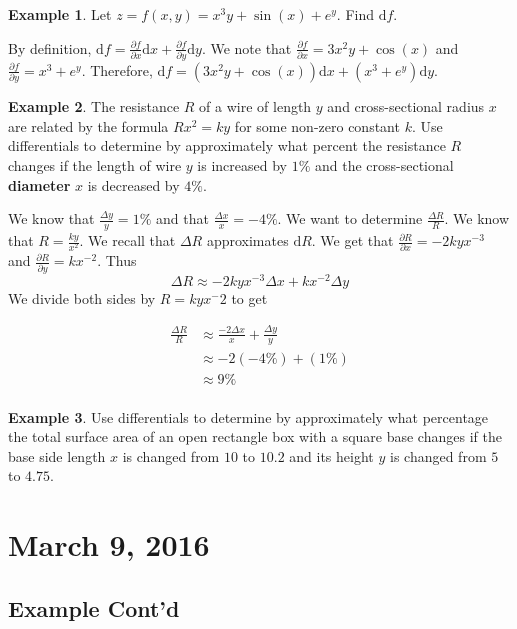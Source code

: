 \documentclass[11pt]{article}
\theoremstyle{plain} %
\theoremstyle{definition}
\theoremstyle{example}
\newtheorem*{example}{Example}
\theoremstyle{remark}
\begin{document}
\begin{example}
Let $z = f(x,y) = x^3y+\sin(x)+e^y$. Find $\mathrm d f$. 

\end{example}By definition, $\mathrm d f = \frac{\partial f}{\partial x} \mathrm d x+ \frac{\partial f}{\partial y} \mathrm d y$. We note that $\frac{\partial f}{\partial x} = 3x^2y + \cos(x)$ and $\frac{\partial f}{\partial y} = x^3 + e^y$. Therefore, $\mathrm d f = \left(3x^2y + \cos(x)\right)\mathrm d x + \left(x^3 + e^y\right)\mathrm d y$.

\begin{example}
The resistance $R$ of a wire of length $y$ and cross-sectional radius $x$ are related by the formula $Rx^2 = ky$ for some non-zero constant $k$. Use differentials to determine by approximately what percent the resistance $R$ changes if the length of wire $y$ is increased by $1\%$ and the cross-sectional \textbf{diameter} $x$ is decreased by $4\%$. 

\end{example}

We know that $\frac{\Delta y}{y} = 1\%$ and that $\frac{\Delta x}{x} = -4\%$. We want to determine $\frac{\Delta R}{R}$. We know that $R = \frac{ky}{x^2}$. We recall that $\Delta R$ approximates $\mathrm d R$. We get that $\frac{\partial R}{\partial x} = -2kyx^{-3}$ and $\frac{\partial R}{\partial y} = kx^{-2}$. Thus $$\Delta R \approx -2kyx^{-3}\Delta x + kx^{-2}\Delta y$$
 We divide both sides by $R = kyx^-2$ to get 
 
 \begin{align*}
 	\frac{\Delta R}{R} &\approx \frac{-2\Delta x}{ x} + \frac{\Delta y}{y}\\
	&\approx -2(-4\%) + (1\%) \\
	&\approx 9\%\\
\end{align*}

\begin{example}
Use differentials to determine by approximately what percentage the total surface area of an open rectangle box with a square base changes if the base side length $x$ is changed from $10$ to $10.2$ and its height $y$ is changed from $5$ to $4.75$.
\end{example}

\section{March 9, 2016}
\subsection{Example Cont'd}
\end{document}
